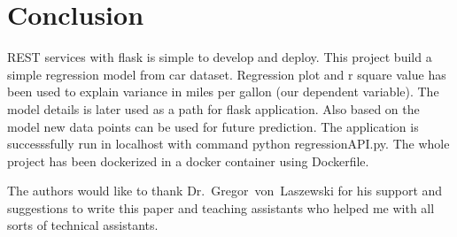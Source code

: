 \section{Conclusion}

REST services with flask is simple to develop and deploy. 
This project build a
simple regression model from car dataset. Regression plot and r square
value has been used to explain variance in miles per gallon (our dependent
variable). The model details is later used as 
a path for flask application. Also based on the model new data points can be 
used for future prediction. The application is successsfully run in localhost
with command python regressionAPI.py. The whole project has been dockerized in
a docker container using Dockerfile. 




\begin{acks}

  The authors would like to thank Dr.~Gregor~von~Laszewski for his
  support and suggestions to write this paper and teaching assistants who
  helped me with all sorts of technical assistants.

\end{acks}




 
